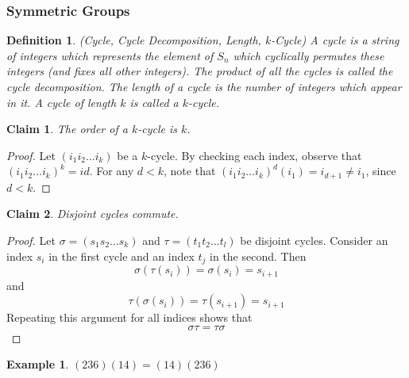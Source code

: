 \documentclass[12pt]{article}
\newtheorem{claim}{Claim}
\newtheorem{definition}{Definition}
\theoremstyle{definition}
\newtheorem{example}{Example}
\theoremstyle{definition}
\begin{document}
\subsubsection{Symmetric Groups}
\begin{definition}(Cycle, Cycle Decomposition, Length, $k$-Cycle)
A cycle is a string of integers which represents the element of $S_n$ which cyclically permutes these integers (and fixes all other integers). The product of all the cycles is called the cycle decomposition. The length of a cycle is the number of integers which appear in it. A cycle of length $k$ is called a $k$-cycle. 
\end{definition}

\begin{claim}
The order of a $k$-cycle is $k$. 
\end{claim}
\begin{proof}
Let $(i_1 i_2 \ldots i_k)$ be a $k$-cycle. By checking each index, observe that $(i_1 i_2 \ldots i_k)^k = id$. For any $d < k$, note that $(i_1 i_2 \ldots i_k)^d (i_1) = i_{d+1} \neq i_1$, since $d < k$. 
\end{proof}

\begin{claim}
Disjoint cycles commute.
\end{claim}
\begin{proof}
Let $\sigma = (s_1 s_2 \ldots s_k)$ and $\tau = (t_1 t_2 \ldots t_l)$ be disjoint cycles. Consider an index $s_i$ in the first cycle and an index $t_j$ in the second. Then
\begin{equation}
\sigma(\tau(s_i)) = \sigma(s_i) = s_{i+1}
\end{equation}
and
\begin{equation}
\tau(\sigma(s_i)) = \tau(s_{i+1}) = s_{i+1}
\end{equation}
Repeating this argument for all indices shows that
\begin{equation}
\sigma \tau = \tau \sigma
\end{equation}
\end{proof}

\begin{example}
$(2 3 6) (1 4) = (1 4) (2 3 6)$
\end{example}
\end{document}
